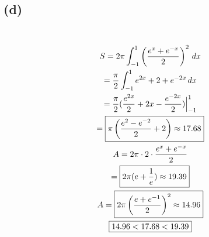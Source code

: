 \documentclass[12pt]{article}
\newcommand*{\paren}[1]{\ensuremath\left(#1\right)}
\newcommand{\at}{\Big|}
\newcommand{\subproblem}[1]{\subsection{(#1)} \,}
\begin{document}
\subproblem{d}
\begin{gather*}
    S= 2\pi \int_{-1}^1 \paren{\frac{e^x+e^{-x}}{2}}^2 \, dx \\
    = \frac{\pi}{2} \int_{-1}^1 e^{2x}+2+e^{-2x} \, dx\\
    =\frac{\pi}{2}(\frac{e^{2x}}{2}+2x-\frac{e^{-2x}}{2})\at_{-1}^1\\
    = \boxed{\pi \paren { \frac{e^2-e^{-2}}{2}+2} \approx 17.68}\\
    A=2\pi \cdot 2\cdot \frac{e^x+e^{-x}}{2}\\
    = \boxed{2\pi (e+\frac{1}{e}) \approx 19.39}\\
    A=\boxed{2\pi \paren{\frac{e+e^{-1}}{2}}^2 \approx 14.96}\\
    \boxed{14.96<17.68<19.39}
\end{gather*}   
\end{document}
